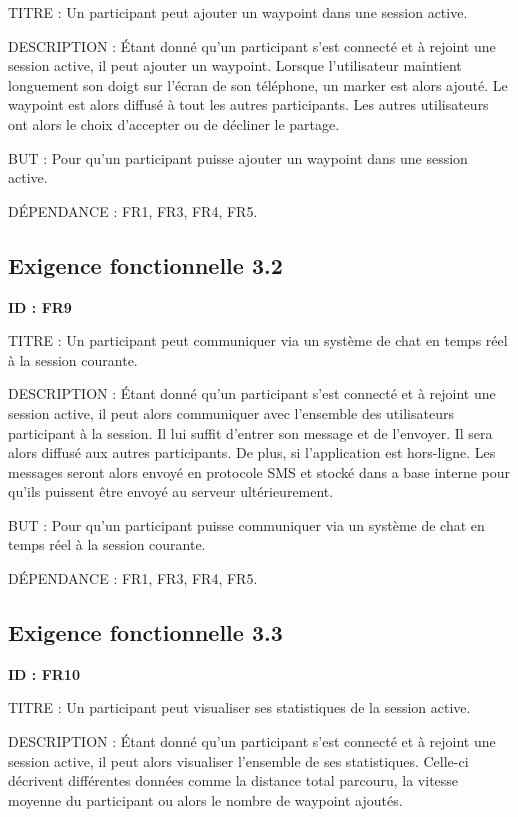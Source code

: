 \documentclass[titlepage, 12pt]{report}
\begin{document}
TITRE : Un participant peut ajouter un waypoint dans une session active.

DESCRIPTION : Étant donné qu'un participant s'est connecté et à rejoint une session active, il peut ajouter un waypoint. Lorsque l'utilisateur maintient longuement son doigt sur l'écran de son téléphone, un marker est alors ajouté. Le waypoint est alors diffusé à tout les autres participants. Les autres utilisateurs ont alors le choix d'accepter ou de décliner le partage.

BUT : Pour qu'un participant puisse ajouter un waypoint dans une session active.

DÉPENDANCE : FR1, FR3, FR4, FR5.

\subsection{Exigence fonctionnelle 3.2}

\textbf{ID : FR9}

TITRE : Un participant peut communiquer via un système de chat en temps réel à la session courante.

DESCRIPTION : Étant donné qu'un participant s'est connecté et à rejoint une session active, il peut alors communiquer avec l'ensemble des utilisateurs participant à la session. Il lui suffit d'entrer son message et de l'envoyer. Il sera alors diffusé aux autres participants.
De plus, si l'application est hors-ligne. Les messages seront alors envoyé en protocole SMS et stocké dans a base interne pour qu'ils puissent être envoyé au serveur ultérieurement. 

BUT : Pour qu'un participant puisse communiquer via un système de chat en temps réel à la session courante.

DÉPENDANCE : FR1, FR3, FR4, FR5.

\subsection{Exigence fonctionnelle 3.3}

\textbf{ID : FR10}

TITRE : Un participant peut visualiser ses statistiques de la session active.

DESCRIPTION : Étant donné qu'un participant s'est connecté et à rejoint une session active, il peut alors visualiser l'ensemble de ses statistiques. Celle-ci décrivent différentes données comme la distance total parcouru, la vitesse moyenne du participant ou alors le nombre de waypoint ajoutés. 
\end{document}
